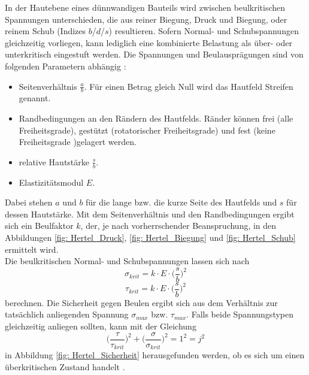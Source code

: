 \noindent In der Hautebene eines dünnwandigen Bauteils wird zwischen beulkritischen Spannungen unterschieden, die aus reiner Biegung, Druck und Biegung, oder reinem Schub (Indizes $b$/$d$/$s$) resultieren. Sofern Normal- und Schubspannungen gleichzeitig vorliegen, kann lediglich eine kombinierte Belastung als über- oder unterkritisch eingestuft werden. Die Spannungen und Beulausprägungen sind von folgenden Parametern abhängig \cite{item1}:
\begin{itemize}
	\item Seitenverhältnis $\frac{a}{b}$. Für einen Betrag gleich Null wird das Hautfeld \glqq Streifen\grqq\: genannt. 
	\item Randbedingungen an den Rändern des Hautfelds. Ränder können frei (alle Freiheitsgrade), gestützt (rotatorischer Freiheitsgrade) und fest (keine Freiheitsgrade )gelagert werden.
	\item relative Hautstärke $\frac{s}{b}$.
	\item Elastizitätsmodul $E$.
\end{itemize}
Dabei stehen $a$ und $b$ für die lange bzw. die kurze Seite des Hautfelds und $s$ für dessen Hautstärke. Mit dem Seitenverhältnis und den Randbedingungen ergibt sich ein Beulfaktor $k$, der, je nach vorherrschender Beanspruchung, in den Abbildungen \ref{fig: Hertel_Druck}, \ref{fig: Hertel_Biegung} und \ref{fig: Hertel_Schub}  ermittelt wird. \\
Die beulkritischen Normal- und Schubspannungen lassen sich nach
\begin{equation}
	\sigma_{krit}=k\cdot E\cdot\Big(\frac{s}{b}\Big)^{2}
\end{equation}
\begin{equation}
	\tau_{krit}=k\cdot E\cdot\Big(\frac{s}{b}\Big)^{2}
\end{equation}
berechnen. Die Sicherheit gegen Beulen ergibt sich aus dem Verhältnis zur tatsächlich anliegenden Spannung $\sigma_{max}$ bzw. $\tau_{max}$. Falls beide Spannungstypen gleichzeitig anliegen sollten, kann mit der Gleichung
\begin{equation}
	\Big(\frac{\tau}{\tau_{krit}}\Big)^{2}+\Big(\frac{\sigma}{\sigma_{krit}}\Big)^{2}=1^{2}=j^{2}
\end{equation}
in Abbildung \ref{fig: Hertel_Sicherheit} herausgefunden werden, ob es sich um einen überkritischen Zustand handelt \cite{item1}.\\

